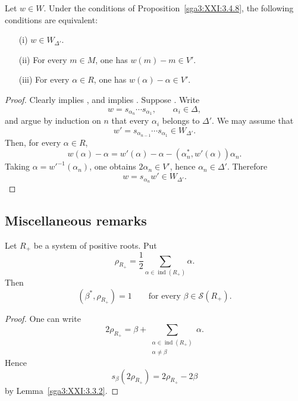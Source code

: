 \begin{lemma}\label{sga3:XXI:3.4.10}
Let \(w\in W\). Under the conditions of
Proposition~\ref{sga3:XXI:3.4.8}, the following conditions are
equivalent:
\begin{enumerate}
\item[\SGAInlineRefTarget{sga3:XXI:3.4.10:item:i}(i)] \(w\in W_{\Delta'}\).
\item[\SGAInlineRefTarget{sga3:XXI:3.4.10:item:ii}(ii)] For every \(m\in M\), one has \(w(m)-m\in V'\).
\item[(iii)] For every \(\alpha\in R\), one has
  \(w(\alpha)-\alpha\in V'\).
\end{enumerate}
\end{lemma}

\begin{proof}
Clearly  implies , and  implies . Suppose .
Write
\[
 w=s_{\alpha_n}\cdots s_{\alpha_1},
 \qquad \alpha_i\in\Delta,
\]
and argue by induction on \(n\) that every \(\alpha_i\) belongs to
\(\Delta'\). We may assume that
\[
 w'=s_{\alpha_{n-1}}\cdots s_{\alpha_1}\in W_{\Delta'}.
\]
Then, for every \(\alpha\in R\),
\[
 w(\alpha)-\alpha
   =w'(\alpha)-\alpha-(\alpha_n^\ast,w'(\alpha))\alpha_n.
\]
Taking \(\alpha=w'^{-1}(\alpha_n)\), one obtains
\(2\alpha_n\in V'\), hence \(\alpha_n\in\Delta'\). Therefore
\[
 w=s_{\alpha_n}w'\in W_{\Delta'}.
\]
\end{proof}

\subsection{Miscellaneous remarks}
\label{sga3:XXI:3.5}

\begin{proposition}\label{sga3:XXI:3.5.1}
Let \(R_+\) be a system of positive roots. Put
\[
 \rho_{R_+}
   =\frac12\sum_{\alpha\in\operatorname{ind}(R_+)}\alpha.
\]
Then
\[
 (\beta^\ast,\rho_{R_+})=1
 \qquad\text{for every }\beta\in\mathscr{S}(R_+).
\]
\end{proposition}

\begin{proof}
One can write
\[
 2\rho_{R_+}
   =\beta+
     \sum_{\substack{\alpha\in\operatorname{ind}(R_+)\\
                     \alpha\ne\beta}}\alpha.
\]
Hence
\[
 s_\beta(2\rho_{R_+})=2\rho_{R_+}-2\beta
\]
by Lemma~\ref{sga3:XXI:3.3.2}.
\end{proof}

